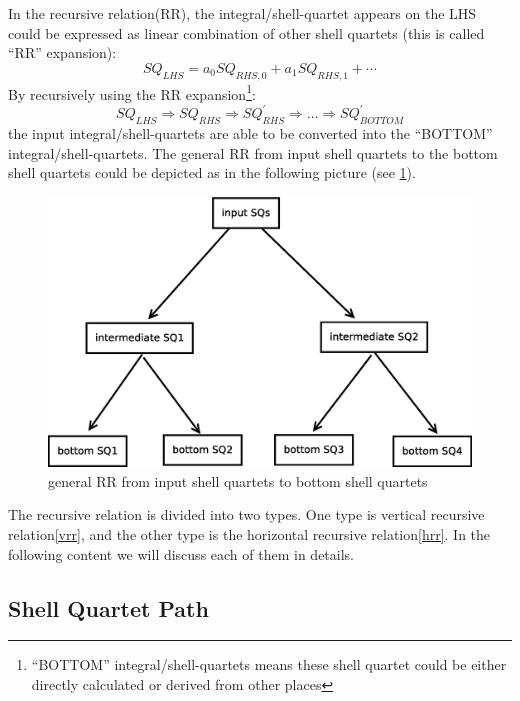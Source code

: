 In the recursive relation(RR), the integral/shell-quartet
appears on the LHS could be expressed as linear combination of 
other shell quartets (this is called ``RR'' expansion)\cite{OS1986,
OS1988, HGP, new_hrr_Schaefer, lindh1991reduced, PRISM, johnson1993efficient, 
gill1994molecular}:
\begin{equation}
 SQ_{LHS} = a_{0}SQ_{RHS,0} + a_{1}SQ_{RHS,1} + \cdots
\end{equation}
By recursively using the RR expansion\footnote{``BOTTOM'' 
integral/shell-quartets means these shell quartet could be either 
directly calculated or derived from other places}:
\begin{equation}
 SQ_{LHS} \Rightarrow SQ_{RHS} \Rightarrow SQ^{'}_{RHS} \Rightarrow
 \dots \Rightarrow SQ^{'}_{BOTTOM}
\end{equation}
the input integral/shell-quartets are able to be converted into the 
``BOTTOM'' integral/shell-quartets. The general RR from input 
shell quartets to the bottom shell quartets could be 
depicted as in the following picture (see \ref{fig:1}).

 \begin{figure}[htb]
 \centering
 \includegraphics[scale=0.5]{./general_rr.eps}
 \caption{general RR from input shell quartets to bottom shell quartets}
 \label{fig:1}
\end{figure}

The recursive relation is divided into two types. One type is 
vertical recursive relation\ref{vrr}, and the other type is the horizontal
recursive relation\ref{hrr}. In the following content we will discuss each
of them in details.

\subsection{Shell Quartet Path}
%
%
%
\label{rr_sq_path}

